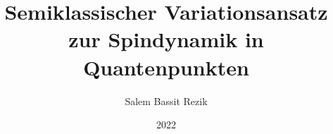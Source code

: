 \documentclass[
  tucolor,       %
  BCOR=12mm,     %
  parskip=half,  %
  open=any,      %
  cleardoublepage=plain,  %
]{tudothesis}
\author{Salem Bassit Rezik}
\title{Semiklassischer Variationsansatz zur Spindynamik in Quantenpunkten}
\date{2022}
\begin{document}
\frontmatter
%
\maketitle

\makecorrectorpage


\tableofcontents

\mainmatter







\appendix
%

\backmatter
\printbibliography

\cleardoublepage

\end{document}
